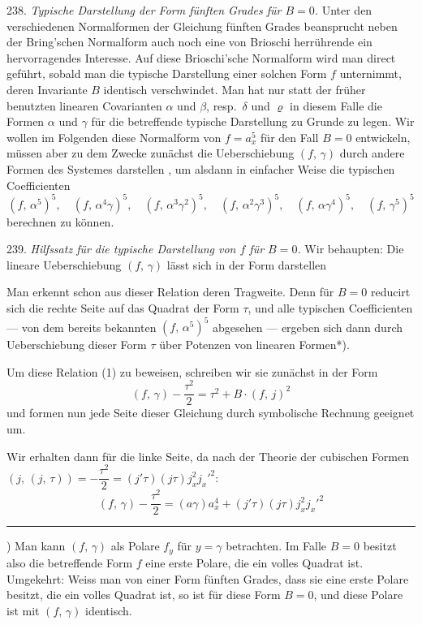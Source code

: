 238. \textit{Typische Darstellung der Form f\"unften Grades f\"ur $B=0$.}
Unter den verschiedenen Normalformen der Gleichung f\"unften Grades
beansprucht neben der Bring'schen Normalform auch noch eine
von Brioschi herr\"uhrende ein hervorragendes Interesse. Auf diese
Brioschi'sche Normalform wird man direct gef\"uhrt, sobald man die
typische Darstellung einer solchen Form $f$ unternimmt, deren Invariante
$B$ identisch verschwindet. Man hat nur statt der fr\"uher benutzten
linearen Covarianten $\alpha$ und $\beta$, resp.\ $\delta$ und $\varrho$ in diesem Falle die
Formen $\alpha$ und $\gamma$ f\"ur die betreffende typische Darstellung zu Grunde
zu legen. Wir wollen im Folgenden diese Normalform von $f=a_x^5$
f\"ur den Fall $B=0$ entwickeln, m\"ussen aber zu dem Zwecke zun\"achst
die Ueberschiebung $(f,\,\gamma)$ durch andere Formen des Systemes darstellen
, um alsdann in einfacher Weise die typischen Coefficienten
\[
(f,\,\alpha^5)^5,\quad (f,\,\alpha^4\gamma)^5,\quad (f,\,\alpha^3\gamma^2)^5,\quad (f,\,\alpha^2\gamma^3)^5,\quad (f,\,\alpha\gamma^4)^5,\quad (f,\,\gamma^5)^5
\]
berechnen zu k\"onnen.

239. \textit{Hilfssatz f\"ur die typische Darstellung von $f$ f\"ur $B=0$.} Wir
behaupten: Die lineare Ueberschiebung $(f,\,\gamma)$ l\"asst sich in der Form
darstellen

Man erkennt schon aus dieser Relation deren Tragweite. Denn
f\"ur $B=0$ reducirt sich die rechte Seite auf das Quadrat der Form
$\tau$, und alle typischen Coefficienten --- von dem bereits bekannten
$(f,\,\alpha^5)^5$ abgesehen --- ergeben sich dann durch Ueberschiebung dieser
Form $\tau$ \"uber Potenzen von linearen Formen*).

Um diese Relation (1) zu beweisen, schreiben wir sie zun\"achst
in der Form
\[
(f,\,\gamma) - \frac{\tau^2}{2} = \tau^2 + B\cdot(f,\,j)^2
\]
und formen nun jede Seite dieser Gleichung durch symbolische Rechnung
geeignet um.

Wir erhalten dann f\"ur die linke Seite, da nach der Theorie der
cubischen Formen $(j,\,(j,\,\tau)) = -\dfrac{\tau^2}{2} = (j'\tau)(j\tau)j_x^2j_x'^2$:
\[
(f,\,\gamma) - \frac{\tau^2}{2} = (a\gamma)a_x^4 + (j'\tau)(j\tau)j_x^2j_x'^2
\]

\rule{4cm}{0.4pt}

\noindent *) Man kann $(f,\,\gamma)$ als Polare $f_y$ f\"ur $y=\gamma$ betrachten. Im Falle $B=0$
besitzt also die betreffende Form $f$ eine erste Polare, die ein volles Quadrat ist.
Umgekehrt: Weiss man von einer Form f\"unften Grades, dass sie eine erste Polare
besitzt, die ein volles Quadrat ist, so ist f\"ur diese Form $B=0$, und diese Polare
ist mit $(f,\,\gamma)$ identisch.


